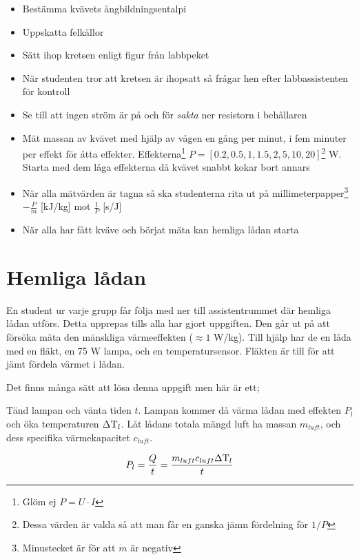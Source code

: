 \documentclass[11pt]{article}
\begin{document}
\begin{itemize}
    \item Bestämma kvävets ångbildningsentalpi
    \item Uppskatta felkällor
    \item Sätt ihop kretsen enligt figur från labbpeket
    \item När studenten tror att kretsen är ihopsatt så frågar hen efter labbassistenten för kontroll
    \item Se till att ingen ström är på och för \emph{sakta} ner resistorn i behållaren
    \item Mät massan av kvävet med hjälp av vågen en gång per minut, i fem minuter per effekt för åtta effekter. Effekterna\footnote{Glöm ej $P = U \cdot I$} $P = [0.2, 0.5, 1, 1.5, 2, 5, 10, 20]$\footnote{Dessa värden är valda så att man får en ganska jämn fördelning för $1/P$} W. Starta med dem låga effekterna då kvävet snabbt kokar bort annars
    \item När alla mätvärden är tagna så ska studenterna rita ut på millimeterpapper\footnote{Minustecket är för att $\dot m$ är negativ} $- \frac{P}{\dot m}$ [kJ/kg] mot $\frac{1}{P}$ [s/J]
    \item När alla har fått kväve och börjat mäta kan hemliga lådan starta
\end{itemize}

\section{Hemliga lådan}

En student ur varje grupp får följa med ner till assistentrummet där hemliga lådan utförs. Detta upprepas tills alla har gjort uppgiften. Den går ut på att försöka mäta den mänskliga värmeeffekten ($\approx 1$ W/kg). Till hjälp har de en låda med en fläkt, en 75 W lampa, och en temperatursensor. Fläkten är till för att jämt fördela värmet i lådan.

Det finns många sätt att lösa denna uppgift men här är ett;

Tänd lampan och vänta tiden $t$. Lampan kommer då värma lådan med effekten $P_l$ och öka temperaturen $\Delta \text T_l$. Låt lådans totala mängd luft ha massan $m_{luft}$, och dess specifika värmekapacitet $c_{luft}$.

\begin{equation*}
    P_l = \frac{Q}{t} = \frac{m_{luft} c_{luft} \Delta \text T_l}{t}
\end{equation*}
\end{document}
